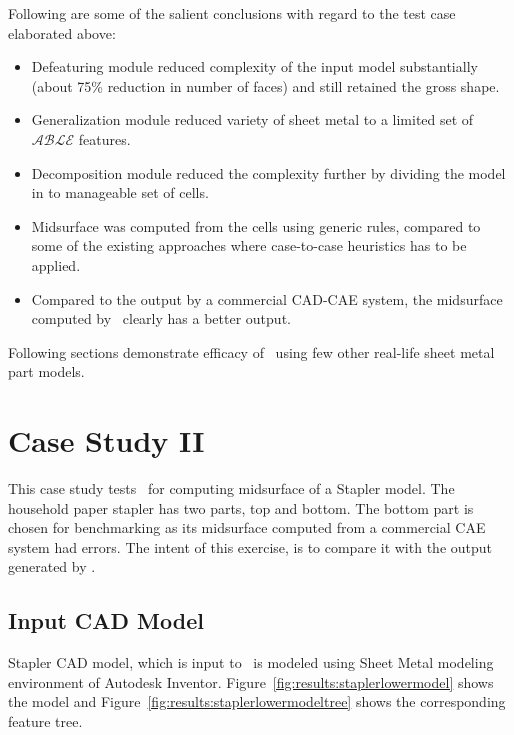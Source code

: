 Following are some of the salient conclusions with regard to the test case elaborated above:

\begin{itemize}[noitemsep,topsep=2pt,parsep=2pt,partopsep=2pt]
\item Defeaturing module reduced complexity of the input model substantially (about 75\% reduction in number of faces) and still retained the gross shape.
\item Generalization module reduced variety of sheet metal to a limited set of $\mathcal{ABLE}$ features.
\item Decomposition module reduced the complexity further by dividing the model in to manageable set of cells.
\item Midsurface was computed from the cells using generic rules, compared to some of the existing approaches where case-to-case heuristics has to be applied.
\item Compared to the output by a commercial CAD-CAE system, the midsurface computed by \mysystemname~clearly has a better output.
\end{itemize}


Following sections demonstrate efficacy of \mysystemname~using few other real-life sheet metal part models.

\section{Case Study II}

This case study tests \mysystemname~for computing midsurface of a Stapler model. The household paper stapler has two parts, top and bottom. The bottom part is chosen for benchmarking as its midsurface computed from a commercial CAE system had errors. The intent of this exercise, is to compare it with the output generated by \mysystemname.


\subsection{Input CAD Model}

Stapler CAD model, which is input to \mysystemname~is modeled using Sheet Metal modeling environment of Autodesk Inventor.  Figure~\ref{fig:results:staplerlowermodel} shows the model and Figure~\ref{fig:results:staplerlowermodeltree} shows the corresponding feature tree.


